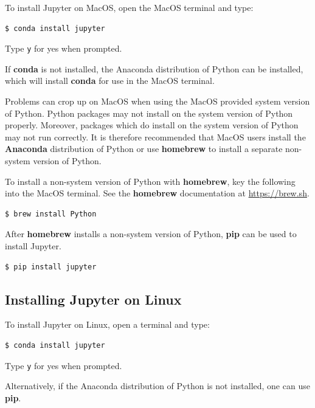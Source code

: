 \documentclass{book}
\begin{document}
To install Jupyter on MacOS, open the MacOS terminal and type:

\begin{lstlisting}
$ conda install jupyter
\end{lstlisting}

Type \lstinline!y! for yes when prompted.

If \textbf{conda} is not installed, the Anaconda distribution of Python
can be installed, which will install \textbf{conda} for use in the MacOS
terminal.

Problems can crop up on MacOS when using the MacOS provided system
version of Python. Python packages may not install on the system version
of Python properly. Moreover, packages which do install on the system
version of Python may not run correctly. It is therefore recommended
that MacOS users install the \textbf{Anaconda} distribution of Python or
use \textbf{homebrew} to install a separate non-system version of
Python.

To install a non-system version of Python with \textbf{homebrew}, key
the following into the MacOS terminal. See the \textbf{homebrew}
documentation at \href{https://brew.sh/}{https://brew.sh}.

\begin{lstlisting}
$ brew install Python
\end{lstlisting}

After \textbf{homebrew} installs a non-system version of Python,
\textbf{pip} can be used to install Jupyter.

\begin{lstlisting}
$ pip install jupyter
\end{lstlisting}
    




    
        \subsection{Installing Jupyter on
Linux}\label{installing-jupyter-on-linux}

To install Jupyter on Linux, open a terminal and type:

\begin{lstlisting}
$ conda install jupyter
\end{lstlisting}

Type \lstinline!y! for yes when prompted.

Alternatively, if the Anaconda distribution of Python is not installed,
one can use \textbf{pip}.
\end{document}
